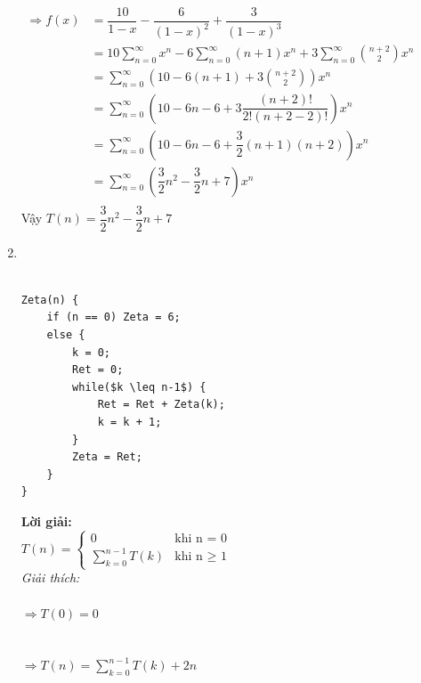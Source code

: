\documentclass[12pt, letterpaper]{article}
\begin{document}
\begin{enumerate}
    $\begin{aligned}
        \Rightarrow f(x) &= \dfrac{10}{1-x} - \dfrac{6}{(1-x)^2} + \dfrac{3}{(1-x)^3}\\
                        &= 10\sum_{n=0}^{\infty}x^n - 6\sum_{n=0}^{\infty}(n+1)x^n + 3\sum_{n=0}^{\infty}\binom{n+2}{2} x^n\\
                        &= \sum_{n=0}^{\infty}(10-6(n+1)+3\binom{n+2}{2})x^n\\
                        &= \sum_{n=0}^{\infty}(10-6n-6+3\dfrac{(n+2)!}{2!(n+2-2)!})x^n\\
                        &= \sum_{n=0}^{\infty}(10-6n-6+\dfrac{3}{2}(n+1)(n+2))x^n\\
                        &= \sum_{n=0}^{\infty}(\dfrac{3}{2}n^2 - \dfrac{3}{2}n + 7)x^n\\
    \end{aligned}$\\
    Vậy $T(n)=\dfrac{3}{2}n^2 - \dfrac{3}{2}n + 7$\\

    \item 
     \\
     \\ 
    \begin{lstlisting}
Zeta(n) {
    if (n == 0) Zeta = 6;
    else {
        k = 0;
        Ret = 0;
        while($k \leq n-1$) {
            Ret = Ret + Zeta(k);
            k = k + 1;
        }
        Zeta = Ret;
    }
}
    \end{lstlisting}
    \textbf{Lời giải:} \\
    $T(n) =
    \begin{cases}
        0 & \text{khi n = 0} \\
        \sum_{k=0}^{n-1} T(k) & \text{khi n $\geq$ 1}
    \end{cases}$ \\
    \textit{Giải thích:} \\
     \\
    $\Rightarrow T(0) = 0$ \\
     \\
     \\
    $\Rightarrow T(n) = \sum_{k=0}^{n-1} T(k) + 2n$ \\


\end{enumerate}
\end{document}
